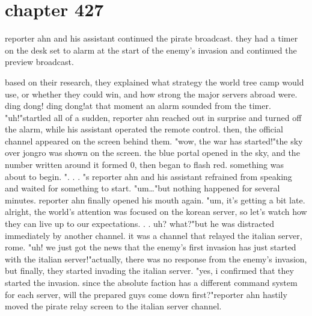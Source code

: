 \section{chapter 427}

reporter ahn and his assistant continued the pirate broadcast.
 they had a timer on the desk set to alarm at the start of the enemy's invasion and continued the preview broadcast.





based on their research, they explained what strategy the world tree camp would use, or whether they could win, and how strong the major servers abroad were.
ding dong! ding dong!at that moment an alarm sounded from the timer.
"uh!"startled all of a sudden, reporter ahn reached out in surprise and turned off the alarm, while his assistant operated the remote control.
 then, the official channel appeared on the screen behind them.
"wow, the war has started!"the sky over jongro was shown on the screen.
 the blue portal opened in the sky, and the number written around it formed 0, then began to flash red.
something was about to begin.
".
.
.
"s reporter ahn and his assistant refrained from speaking and waited for something to start.
"um…"but nothing happened for several minutes.
 reporter ahn finally opened his mouth again.
"um, it's getting a bit late.
 alright, the world's attention was focused on the korean server, so let's watch how they can live up to our expectations.
.
.
uh? what?"but he was distracted immediately by another channel.
 it was a channel that relayed the italian server, rome.
"uh! we just got the news that the enemy's first invasion has just started with the italian server!"actually, there was no response from the enemy's invasion, but finally, they started invading the italian server.
"yes, i confirmed that they started the invasion.
 since the absolute faction has a different command system for each server, will the prepared guys come down first?"reporter ahn hastily moved the pirate relay screen to the italian server channel.

